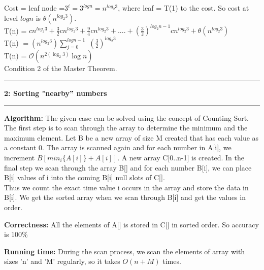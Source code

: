 \documentclass[11pt]{article}
\newcommand\question[2]{\vspace{.25in}\hrule\textbf{#1: #2}\vspace{.5em}\hrule\vspace{.10in}}
\newcommand\algorithm{\vspace{.10in}\textbf{Algorithm: }}
\newcommand\correctness{\vspace{.10in}\textbf{Correctness: }}
\newcommand\runtime{\vspace{.10in}\textbf{Running time: }}
\begin{document}
 
Cost = leaf node =$ 3^i = 3^{log n} = n^{log_{2} 3}$, where leaf = T(1) to the cost. So cost at level $log n$ is $\theta (n^{log_{2} 3}).$
\\ T(n) = $cn^{log_{2} 3} + \frac{3}{2} cn^{log_{2} 3}+\frac{9}{4} cn^{log_{2} 3}+ ....+(\frac{3}{2})^{log_{2} n-1} cn^{log_{2} 3} + \theta(n^{log_{2} 3})$
\\T(n) $= (n^{log_{2} 3})\sum_{j=0}^{logn -1}$ $(\frac{3}{2})^{log_{2} 3}$
\\T(n) = $\mathcal{O}(n^{2(\log_{2} 3)} \log n)$
\\Condition 2 of the Master Theorem.

\question{2}{Sorting "nearby'' numbers} 

\algorithm The given case can be solved using the concept of Counting Sort. The first step is to scan through the array to determine the minimum and the maximum element. Let B be a new array of size M created that has each value as a constant 0. The array is scanned again and for each number in A[i], we increment $B[min_{i}\{A[i]\} + A[i]]$. A new array C[0..n-1] is created. In the final step we scan through the array B[] and for each number B[i], we can place B[i] values of i into the coming B[i] null slots of C[].
\\Thus we count the exact time value i occurs in the array and store the data in B[i]. We get the sorted array when we scan through B[i] and get the values in order.
  
\correctness All the elements of A[] is stored in C[] in sorted order. So accuracy is 100\%

\runtime During the scan process, we scan the elements of array with sizes 'n' and 'M' regularly, so it takes $O(n + M)$ times.
\end{document}
